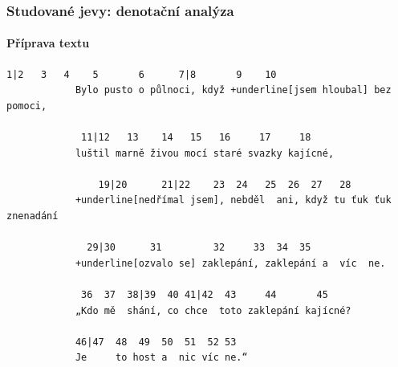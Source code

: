 \documentclass[12pt,xcolor=usenames,dvipsnames]{beamer}
\begin{document}
\begin{frame}[fragile]
	\frametitle{Studované jevy: denotační analýza}
	\framesubtitle{Příprava textu}

	\vspace{-10pt}
	\begin{footnotesize}
		\begin{Verbatim}[commandchars=+\[\]]
			 1|2   3   4    5       6      7|8       9    10
			Bylo pusto o půlnoci, když +underline[jsem hloubal] bez pomoci,
			
			 11|12   13    14   15   16     17     18
			luštil marně živou mocí staré svazky kajícné,
			
			    19|20      21|22    23  24   25  26  27   28
			+underline[nedřímal jsem], nebděl  ani, když tu ťuk ťuk znenadání
			
			  29|30      31         32     33  34  35
			+underline[ozvalo se] zaklepání, zaklepání a  víc  ne.
			
			 36  37  38|39  40 41|42  43     44       45
			„Kdo mě  shání, co chce  toto zaklepání kajícné?
			
			46|47  48  49  50  51  52 53
			Je     to host a  nic víc ne.“
		\end{Verbatim}	
	\end{footnotesize}

\end{frame}
\end{document}
